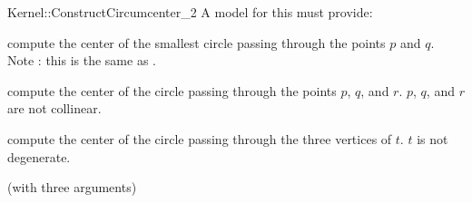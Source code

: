 \begin{ccRefFunctionObjectConcept}{Kernel::ConstructCircumcenter_2}
A model for this must provide:


 {compute the center of the smallest circle passing through the points $p$ and $q$.  Note : this is the same as . }

 {compute the center of the circle passing through the points $p$, $q$, and $r$.
  \ccPrecond $p$, $q$, and $r$ are not collinear.}

 {compute the center of the circle passing through the three vertices of $t$.
  \ccPrecond $t$ is not degenerate.}

\ccRefines
{} (with three arguments)

\ccSeeAlso
{} \\

\end{ccRefFunctionObjectConcept}
